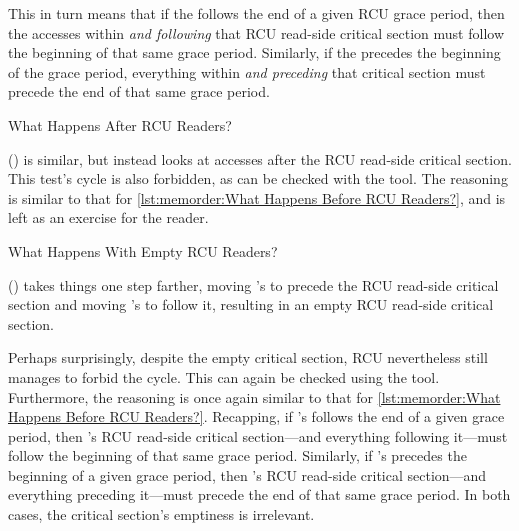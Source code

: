 This in turn means that if the  follows the end of a
given RCU grace period, then the accesses within \emph{and following}
that RCU read-side critical section must follow the beginning of that
same grace period.
Similarly, if the  precedes the beginning of the grace
period, everything within \emph{and preceding} that critical section
must precede the end of that same grace period.

\begin{listing}

\caption{What Happens After RCU Readers?}
\label{lst:memorder:What Happens After RCU Readers?}
\end{listing}

()
is similar, but instead looks at accesses after the RCU read-side
critical section.
This test's cycle is also forbidden, as can be checked with the 
tool.
The reasoning is similar to that for
\cref{lst:memorder:What Happens Before RCU Readers?},
and is left as an exercise for the reader.

\begin{listing}

\caption{What Happens With Empty RCU Readers?}
\label{lst:memorder:What Happens With Empty RCU Readers?}
\end{listing}

()
takes things one step farther, moving 's 
to precede the RCU read-side critical section and moving
's  to follow it, resulting in an
empty RCU read-side critical section.

Perhaps surprisingly, despite the empty critical section, RCU nevertheless
still manages to forbid the cycle.
This can again be checked using the  tool.
Furthermore, the reasoning is once again similar to that for
\cref{lst:memorder:What Happens Before RCU Readers?}.
Recapping, if 's  follows the end of a given
grace period, then 's RCU read-side critical section---and
everything following it---must follow the beginning of that same grace
period.
Similarly, if 's  precedes the beginning of a
given grace period, then 's RCU read-side critical section---and
everything preceding it---must precede the end of that same grace period.
In both cases, the critical section's emptiness is irrelevant.

